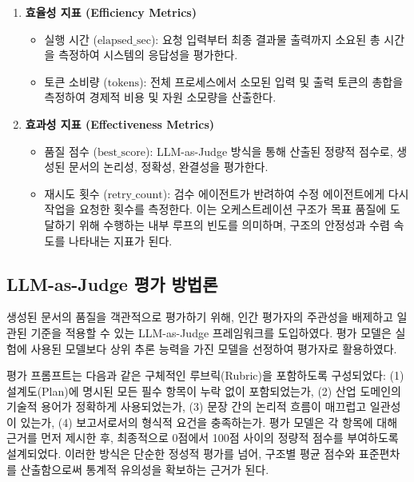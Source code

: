 \begin{enumerate}
    \item \textbf{효율성 지표 (Efficiency Metrics)}
    \begin{itemize}
        \item 실행 시간 ($\text{elapsed\_sec}$): 요청 입력부터 최종 결과물 출력까지 소요된 총 시간을 측정하여 시스템의 응답성을 평가한다.
        \item 토큰 소비량 ($\text{tokens}$): 전체 프로세스에서 소모된 입력 및 출력 토큰의 총합을 측정하여 경제적 비용 및 자원 소모량을 산출한다.
    \end{itemize}
    \item \textbf{효과성 지표 (Effectiveness Metrics)}
    \begin{itemize}
        \item 품질 점수 ($\text{best\_score}$): LLM-as-Judge 방식을 통해 산출된 정량적 점수로, 생성된 문서의 논리성, 정확성, 완결성을 평가한다.
        \item 재시도 횟수 ($\text{retry\_count}$): 검수 에이전트가 반려하여 수정 에이전트에게 다시 작업을 요청한 횟수를 측정한다. 이는 오케스트레이션 구조가 목표 품질에 도달하기 위해 수행하는 내부 루프의 빈도를 의미하며, 구조의 안정성과 수렴 속도를 나타내는 지표가 된다.
    \end{itemize}
\end{enumerate}

\subsection{LLM-as-Judge 평가 방법론}
생성된 문서의 품질을 객관적으로 평가하기 위해, 인간 평가자의 주관성을 배제하고 일관된 기준을 적용할 수 있는 LLM-as-Judge 프레임워크를 도입하였다. 평가 모델은 실험에 사용된 모델보다 상위 추론 능력을 가진 모델을 선정하여 평가자로 활용하였다.

평가 프롬프트는 다음과 같은 구체적인 루브릭(Rubric)을 포함하도록 구성되었다: (1) 설계도(Plan)에 명시된 모든 필수 항목이 누락 없이 포함되었는가, (2) 산업 도메인의 기술적 용어가 정확하게 사용되었는가, (3) 문장 간의 논리적 흐름이 매끄럽고 일관성이 있는가, (4) 보고서로서의 형식적 요건을 충족하는가. 평가 모델은 각 항목에 대해 근거를 먼저 제시한 후, 최종적으로 0점에서 100점 사이의 정량적 점수를 부여하도록 설계되었다. 이러한 방식은 단순한 정성적 평가를 넘어, 구조별 평균 점수와 표준편차를 산출함으로써 통계적 유의성을 확보하는 근거가 된다.